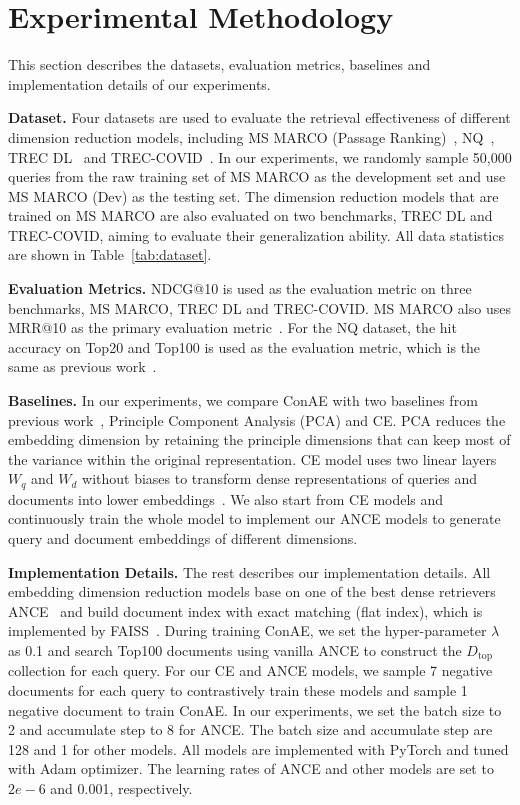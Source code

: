 \documentclass[11pt]{article}
\begin{document}
 
\section{Experimental Methodology}
This section describes the datasets, evaluation metrics, baselines and implementation details of our experiments.


\textbf{Dataset.} Four datasets are used to evaluate the retrieval effectiveness of different dimension reduction models, including MS MARCO (Passage Ranking)~\cite{bajaj2016ms}, NQ~\cite{kwiatkowski2019natural}, TREC DL~\cite{craswelloverview} and TREC-COVID~\cite{roberts2020trec}.
In our experiments, we randomly sample 50,000 queries from the raw training set of MS MARCO as the development set and use MS MARCO (Dev) as the testing set. The dimension reduction models that are trained on MS MARCO are also evaluated on two benchmarks, TREC DL and TREC-COVID, aiming to evaluate their generalization ability. All data statistics are shown in Table~\ref{tab:dataset}.



\textbf{Evaluation Metrics.} NDCG@10 is used as the evaluation metric on three benchmarks, MS MARCO, TREC DL and TREC-COVID. MS MARCO also uses MRR@10 as the primary evaluation metric~\cite{bajaj2016ms}. For the NQ dataset, the hit accuracy on Top20 and Top100 is used as the evaluation metric, which is the same as previous work~\cite{karpukhin2020dense}.

\textbf{Baselines.} In our experiments, we compare ConAE with two baselines from previous work~\cite{ma2021simple}, Principle Component Analysis (PCA) and CE. PCA reduces the embedding dimension by retaining the principle dimensions that can keep most of the variance within the original representation. CE model uses two linear layers $W_q$ and $W_d$ without biases to transform dense representations of queries and documents into lower embeddings~\cite{ma2021simple}. We also start from CE models and continuously train the whole model to implement our ANCE models to generate query and document embeddings of different dimensions.

\textbf{Implementation Details.}
The rest describes our implementation details. 
All embedding dimension reduction models base on one of the best dense retrievers ANCE~\cite{xiong2020approximate} and build document index with exact matching (flat index), which is implemented by FAISS~\cite{johnson2019billion}. During training ConAE, we set the hyper-parameter $\lambda$ as 0.1 and search Top100 documents using vanilla ANCE to construct the $D_{\text{top}}$ collection for each query. For our CE and ANCE models, we sample 7 negative documents for each query to contrastively train these models and sample 1 negative document to train ConAE. In our experiments, we set the batch size to 2 and accumulate step to 8 for ANCE. The batch size and accumulate step are 128 and 1 for other models. All models are implemented with PyTorch and tuned with Adam optimizer. The learning rates of ANCE and other models are set to $2e-6$ and 0.001, respectively.
\end{document}
